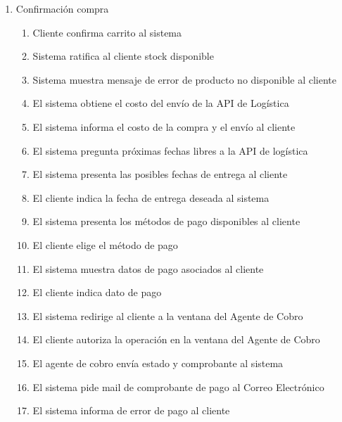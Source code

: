 \begin{enumerate}
\item Confirmación compra
  \begin{enumerate}
  	\item Cliente confirma carrito al sistema \label{itm:f-cliente-confirma-carrito-sistema}
  	\item Sistema ratifica al cliente stock disponible \label{itm:f-sistema-confirma-stock-cliente}
    \item Sistema muestra mensaje de error de producto no disponible al cliente \label{itm:f-sistema-error-stock-cliente}
    \item El sistema obtiene el costo del envío de la API de Logística \label{itm:f-apilogistica-envia-costo-sistema}
    \item El sistema informa el costo de la compra y el envío al cliente \label{itm:f-sistema-envia-costo-cliente}
    \item El sistema pregunta próximas fechas libres a la API de logística \label{itm:f-apilogistica-fechas-libres-sistema}
    \item El sistema presenta las posibles fechas de entrega al cliente \label{itm:f-sistema-fechas-libres-cliente}
    \item El cliente indica la fecha de entrega deseada al sistema \label{itm:f-cliente-fecha-entrega-sistema}
    \item El sistema presenta los métodos de pago disponibles al cliente \label{itm:f-sistema-muestra-metodos-pago-cliente}
    \item El cliente elige el método de pago \label{itm:f-cliente-elige-metodo-pago-sistema}
    \item El sistema muestra datos de pago asociados al cliente \label{itm:f-sistema-muestra-datos-pago-cliente}
    \item El cliente indica dato de pago \label{itm:f-cliente-elige-dato-pago-sistema}
    \item El sistema redirige al cliente a la ventana del Agente de Cobro \label{itm:f-sistema-redirige-cliente}
    \item El cliente autoriza la operación en la ventana del Agente de Cobro \label{itm:f-cliente-autoriza-agentecobro}
	\item El agente de cobro envía estado y comprobante al sistema \label{itm:f-agentecobro-comprobante-sistema}
	\item El sistema pide mail de comprobante de pago al Correo Electrónico \label{itm:f-sistema-envia-comprobante-correoelectronico}
    \item El sistema informa de error de pago al cliente \label{itm:f-sistema-error-pago-cliente}

\end{enumerate}
\end{enumerate}
